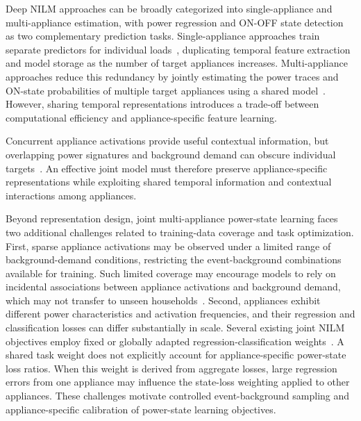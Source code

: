 \documentclass[journal]{IEEEtran}
\begin{document}
Deep NILM approaches can be broadly categorized into single-appliance and multi-appliance estimation, with power regression and ON-OFF state detection~\cite{singhal2019multilabel,tanoni2023weaklabels} as two complementary prediction tasks. Single-appliance approaches train separate predictors for individual loads~\cite{wang2022transformer,petralia2025nilmformer}, duplicating temporal feature extraction and model storage as the number of target appliances increases. Multi-appliance approaches reduce this redundancy by jointly estimating the power traces and ON-state probabilities of multiple target appliances using a shared model~\cite{faustine2020unet,alami2023convnilm,virtsionis2023multitarget,dash2024joint,sun2025transfer}. However, sharing temporal representations introduces a trade-off between computational efficiency and appliance-specific feature learning.

Concurrent appliance activations provide useful contextual information, but overlapping power signatures and background demand can obscure individual targets~\cite{liu2026recomposition}. An effective joint model must therefore preserve appliance-specific representations while exploiting shared temporal information and contextual interactions among appliances.

Beyond representation design, joint multi-appliance power-state learning faces two additional challenges related to training-data coverage and task optimization. First, sparse appliance activations may be observed under a limited range of background-demand conditions, restricting the event-background combinations available for training. Such limited coverage may encourage models to rely on incidental associations between appliance activations and background demand, which may not transfer to unseen households~\cite{liu2026recomposition}. Second, appliances exhibit different power characteristics and activation frequencies, and their regression and classification losses can differ substantially in scale. Several existing joint NILM objectives employ fixed or globally adapted regression-classification weights~\cite{sun2025transfer,liu2022samnet}. A shared task weight does not explicitly account for appliance-specific power-state loss ratios. When this weight is derived from aggregate losses, large regression errors from one appliance may influence the state-loss weighting applied to other appliances. These challenges motivate controlled event-background sampling and appliance-specific calibration of power-state learning objectives.
\end{document}
